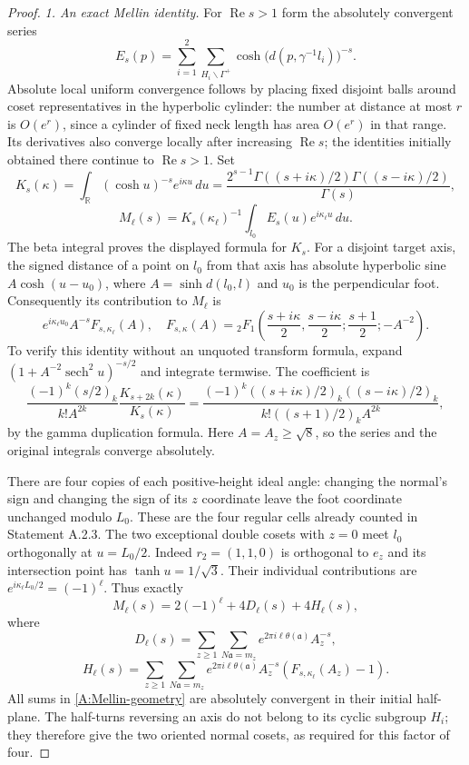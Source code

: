 \begin{proof}
\emph{1. An exact Mellin identity.}
For $\operatorname{Re}s>1$ form the absolutely convergent series
\[
 E_s(p)=\sum_{i=1}^2\sum_{H_i\backslash\Gamma^+}
       \cosh\bigl(d(p,\gamma^{-1}l_i)\bigr)^{-s}.
\]
Absolute local uniform convergence follows by placing fixed disjoint
balls around coset representatives in the hyperbolic cylinder:
the number at distance at most $r$ is $O(e^r)$, since a cylinder
of fixed neck length has area $O(e^r)$ in that range. Its derivatives
also converge locally after increasing $\operatorname{Re}s$; the
identities initially obtained there continue to $\operatorname{Re}s>1$.
Set
\[
 K_s(\kappa)=\int_{\mathbb R}(\cosh u)^{-s}e^{i\kappa u}\,du
 =\frac{2^{s-1}\Gamma((s+i\kappa)/2)\Gamma((s-i\kappa)/2)}{\Gamma(s)},
\]
\[
 M_\ell(s)=K_s(\kappa_\ell)^{-1}
                 \int_{l_0}E_s(u)e^{i\kappa_\ell u}\,du.
\]
The beta integral proves the displayed formula for $K_s$.
For a disjoint target axis, the signed distance of a point on $l_0$
from that axis has absolute hyperbolic sine
$A\cosh(u-u_0)$, where $A=\sinh d(l_0,l)$ and $u_0$ is the
perpendicular foot. Consequently its contribution to $M_\ell$ is
\[
 e^{i\kappa_\ell u_0}A^{-s}F_{s,\kappa_\ell}(A),\quad
 F_{s,\kappa}(A)=
 {}_2F_1\left(\frac{s+i\kappa}{2},\frac{s-i\kappa}{2};
                    \frac{s+1}{2};-A^{-2}\right).
\]
To verify this identity without an unquoted transform formula, expand
$(1+A^{-2}\operatorname{sech}^2u)^{-s/2}$ and integrate termwise.
The coefficient is
\[
 \frac{(-1)^k(s/2)_k}{k!A^{2k}}
      \frac{K_{s+2k}(\kappa)}{K_s(\kappa)}
 =\frac{(-1)^k((s+i\kappa)/2)_k((s-i\kappa)/2)_k}
          {k!((s+1)/2)_k A^{2k}},
\]
by the gamma duplication formula. Here $A=A_z\geq\sqrt8$, so the
series and the original integrals converge absolutely.

There are four copies of each positive-height ideal angle: changing
the normal's sign and changing the sign of its $z$ coordinate leave
the foot coordinate unchanged modulo $L_0$. These are the four
regular cells already counted in Statement A.2.3. The two exceptional
double cosets with $z=0$ meet $l_0$ orthogonally at $u=L_0/2$.
Indeed $r_2=(1,1,0)$ is orthogonal to $e_z$ and its intersection
point has $\tanh u=1/\sqrt3$. Their individual contributions are
$e^{i\kappa_\ell L_0/2}=(-1)^\ell$. Thus exactly
\begin{equation}\label{A:Mellin-geometry}
 M_\ell(s)=2(-1)^\ell+4D_\ell(s)+4H_\ell(s),
\end{equation}
where
\[
 D_\ell(s)=\sum_{z\geq1}\sum_{N\mathfrak a=m_z}
          e^{2\pi i\ell\theta(\mathfrak a)}A_z^{-s},
\]
\[
 H_\ell(s)=\sum_{z\geq1}\sum_{N\mathfrak a=m_z}
 e^{2\pi i\ell\theta(\mathfrak a)}A_z^{-s}
                    (F_{s,\kappa_\ell}(A_z)-1).
\]
All sums in \eqref{A:Mellin-geometry} are absolutely convergent
in their initial half-plane. The half-turns reversing an axis do not
belong to its cyclic subgroup $H_i$; they therefore give the two
oriented normal cosets, as required for this factor of four.


\end{proof}
